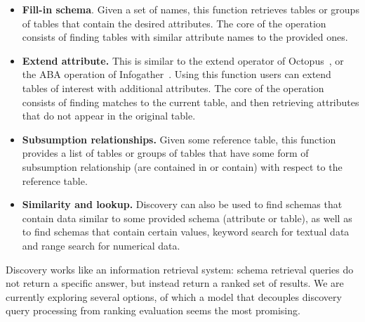 \begin{itemize}
\item \textbf{Fill-in schema}. Given a set of names, this function retrieves 
tables or groups of tables that contain the desired attributes. The core
of the operation consists of finding tables with similar attribute names to the
provided ones.

\item \textbf{Extend attribute.} This is similar to the extend operator of
Octopus~\cite{octopus}, or the ABA operation of
Infogather~\cite{DBLP:conf/sigmod/YakoutGCC12}. Using this function users can
extend tables of interest with additional attributes. The core of the operation
consists of finding matches to the current table, and then retrieving 
attributes that do not appear in the original table.

\item \textbf{Subsumption relationships.} Given some reference table, this
function provides a list of tables or groups of tables that have some form of
subsumption relationship (\ie are contained in or contain) with respect to the
reference table. 

\item \textbf{Similarity and lookup.} Discovery can also be used to find schemas
that contain data similar to some provided schema (attribute or table), as well
as to find schemas that contain certain values, \ie keyword search for textual
data and range search for numerical data.  

\end{itemize}

Discovery works like an information retrieval system: schema retrieval queries
do not return a specific answer, but instead return a ranked set of results. We
are currently exploring several options, of which a model that decouples
discovery query processing from ranking evaluation seems the most promising.


